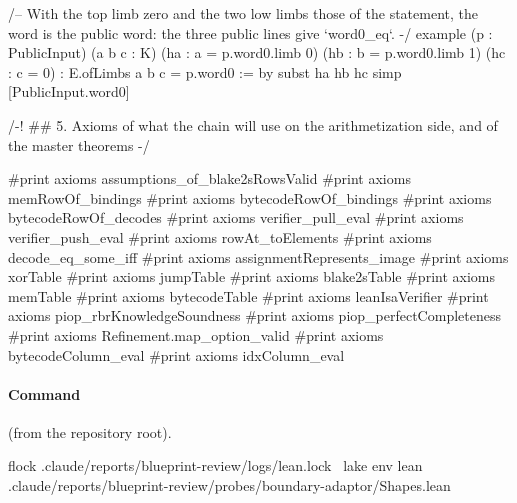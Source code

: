 \begin{leancode}[numbers=left,numbersep=3pt]
/-- With the top limb zero and the two low limbs those of the statement, the word is the public
word: the three public lines give `word0_eq`. -/
example (p : PublicInput) (a b c : K) (ha : a = p.word0.limb 0) (hb : b = p.word0.limb 1)
    (hc : c = 0) : E.ofLimbs a b c = p.word0 := by
  subst ha hb hc
  simp [PublicInput.word0]

/-! ## 5. Axioms of what the chain will use on the arithmetization side, and of the master
theorems -/

#print axioms assumptions_of_blake2sRowsValid
#print axioms memRowOf_bindings
#print axioms bytecodeRowOf_bindings
#print axioms bytecodeRowOf_decodes
#print axioms verifier_pull_eval
#print axioms verifier_push_eval
#print axioms rowAt_toElements
#print axioms decode_eq_some_iff
#print axioms assignmentRepresents_image
#print axioms xorTable
#print axioms jumpTable
#print axioms blake2sTable
#print axioms memTable
#print axioms bytecodeTable
#print axioms leanIsaVerifier
#print axioms piop_rbrKnowledgeSoundness
#print axioms piop_perfectCompleteness
#print axioms Refinement.map_option_valid
#print axioms bytecodeColumn_eval
#print axioms idxColumn_eval
\end{leancode}

\paragraph{Command} (from the repository root).
\begin{shellcode}
flock .claude/reports/blueprint-review/logs/lean.lock \
  lake env lean .claude/reports/blueprint-review/probes/boundary-adaptor/Shapes.lean
\end{shellcode}


